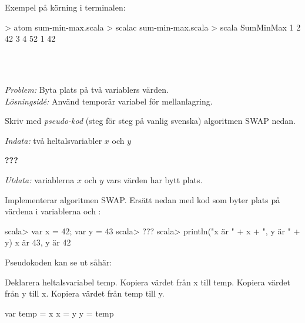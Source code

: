 Exempel på körning i terminalen:
\begin{REPL}
> atom sum-min-max.scala
> scalac sum-min-max.scala
> scala SumMinMax 1 2 42 3 4
52 1 42
\end{REPL}

\SOLUTION

\TaskSolved \what~


\QUESTEND







\QUESTBEGIN

\Task  \what~\\\emph{Problem:} Byta plats på två variablers värden. \\\emph{Lösningsidé:} Använd temporär variabel för mellanlagring.

\Subtask Skriv med \emph{pseudo-kod} (steg för steg på vanlig svenska) algoritmen SWAP nedan.

\emph{Indata:} två heltalsvariabler $x$ och $y$

\textbf{???}

\emph{Utdata:} variablerna $x$ och $y$ vars värden har bytt plats.

\Subtask Implementerar algoritmen SWAP. Ersätt  nedan med kod som byter plats på värdena i variablerna  och :

\begin{REPL}
scala> var x = 42; var y = 43
scala> ???
scala> println("x är " + x + ", y är " + y)
x är 43, y är 42
\end{REPL}

\SOLUTION

\TaskSolved \what

\SubtaskSolved  Pseudokoden kan se ut såhär:
\begin{Code}
Deklarera heltalsvariabel temp.
Kopiera värdet från x till temp.
Kopiera värdet från y till x.
Kopiera värdet från temp till y.
\end{Code}

\SubtaskSolved
\begin{Code}
var temp = x
x = y
y = temp
\end{Code}

\QUESTEND





\QUESTBEGIN

